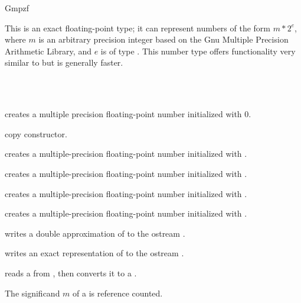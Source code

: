 \begin{ccRefClass} {Gmpzf}
\label{Gmpzf}

\ccDefinition

This is an exact floating-point type; it can represent numbers
of the form $m*2^e$, where $m$ is an arbitrary precision integer 
based on the {\sc Gnu} Multiple Precision Arithmetic Library,
and $e$ is of type . This number type offers functionality
very similar to  but is generally faster.


\ccIsModel
{}\\
\\

\ccCreation
{}

             {creates a multiple precision floating-point number
               initialized with $0$.}

\ccHidden {}
            {copy constructor.}

            {creates a multiple-precision floating-point number 
              initialized with
             .}

            {creates a multiple-precision floating-point number 
              initialized with
             .}

            {creates a multiple-precision floating-point number 
              initialized with
             .}

            {creates a multiple-precision  floating-point number
              initialized with .}
\ccOperations

{writes a double approximation of  to the ostream .}

{writes an exact representation of  to the ostream .}

{reads a  from , then converts it to a .}

\ccImplementation
The significand $m$ of a  is reference counted.

\end{ccRefClass} 
